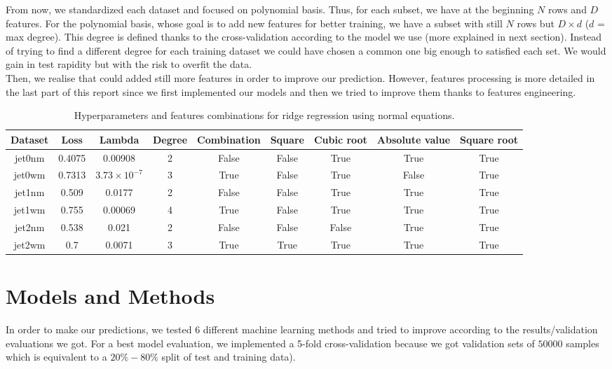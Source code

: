 \documentclass[10pt,conference,compsocconf]{IEEEtran}
\begin{document}
From now, we standardized each dataset and focused on polynomial basis. Thus, for each subset, we have at the beginning $N$ rows and $D$ features. For the polynomial basis, whose goal is to add new features for better training, we have a subset with still $N$ rows but $D\times d$ ($d$ = max degree). This degree is defined thanks to the cross-validation according to the model we use (more explained in next section). Instead of trying to find a different degree for each training dataset we could have chosen a common one big enough to satisfied each set. We would gain in test rapidity but with the risk to overfit the data.\\ 

Then, we realise that could added still more features in order to improve our prediction. However, features processing is more detailed in the last part of this report since we first implemented our models and then we tried to improve them thanks to features engineering.

\begin{table}[htbp]
  \centering
  \begin{tabular}[c]{|c||c|c|c|c|c|c|c|c|}
    \hline
    Dataset&Loss&Lambda&Degree&Combination&Square&Cubic root&Absolute value&Square root \\
    \hline
    \hline
    jet0nm&0.4075&0.00908&2&False&False&True&True&True\\
    jet0wm&0.7313&$3.73\times10^{-7}$&3&True&False&True&False&True\\
    jet1nm&0.509&0.0177&2&False&False&True&True&True\\
    jet1wm&0.755&0.00069&4&True&False&True&True&True\\
    jet2nm&0.538&0.021&2&False&False&False&True&True\\
    jet2wm&0.7&0.0071&3&True&True&True&True&True\\
    \hline
  \end{tabular}
  \caption{Hyperparameters and features combinations for ridge regression using normal equations.}
  \label{tab:table1}
\end{table}

\section{Models and Methods}
\label{sec:structure-paper}

In order to make our predictions, we tested $6$ different machine learning methods and tried to improve according to the results/validation evaluations we got. For a best model evaluation, we implemented a 5-fold cross-validation because we got validation sets of $50 000$ samples which is equivalent to a $20\%-80\%$ split of test and training data). 
\end{document}
